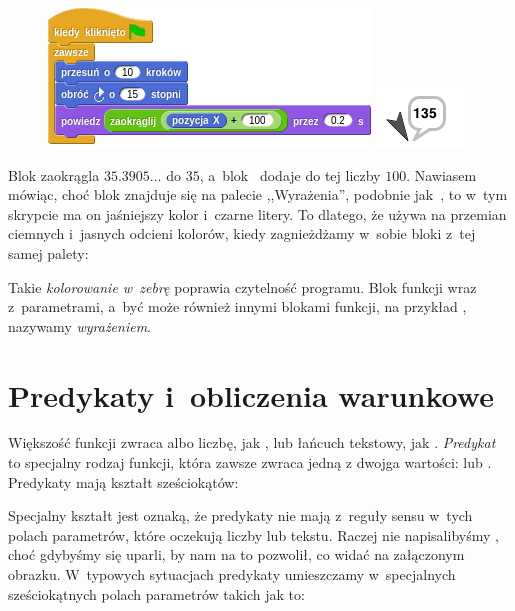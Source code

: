 \documentclass[a4paper]{report}
\begin{document}
\begin{figure}[H]
\centering
\includegraphics[scale=\defaultGraphicsScale]{uzycie-funkcji-do-obliczen}%
\hspace{2em}%
\includegraphics{../common/turtle-says-its-rounded-position}
\end{figure}

Blok  zaokrągla $35.3905\ldots$ do $35$, a~blok~\code{+} dodaje do tej liczby $100$. Nawiasem mówiąc, choć blok  znajduje się na palecie ,,Wyrażenia'', podobnie jak~\code{+}, to w~tym skrypcie ma on jaśniejszy kolor i~czarne litery. To dlatego, że \Snap{} używa na przemian ciemnych i~jasnych odcieni kolorów, kiedy zagnieżdżamy w~sobie bloki z~tej samej palety:\nopagebreak


Takie \emph{kolorowanie w~zebrę} poprawia czytelność programu. Blok funkcji wraz z~parametrami, a~być może również innymi blokami funkcji, na przykład , nazywamy \emph{wyrażeniem}.

\section{Predykaty i~obliczenia warunkowe}

Większość funkcji zwraca albo liczbę, jak , lub łańcuch tekstowy, jak . \emph{Predykat} to specjalny rodzaj funkcji, która zawsze zwraca jedną z dwojga wartości:  lub . Predykaty mają kształt sześciokątów:\nopagebreak


\begin{sloppypar}
Specjalny kształt jest oznaką, że predykaty nie mają z~reguły sensu w~tych polach parametrów, które oczekują liczby lub tekstu. Raczej nie napisalibyśmy , choć gdybyśmy się uparli, \Snap{} by nam na to pozwolił, co widać na załączonym obrazku. W~typowych sytuacjach predykaty umieszczamy w~specjalnych sześciokątnych polach parametrów takich jak to:\nopagebreak
\end{sloppypar}
\end{document}
